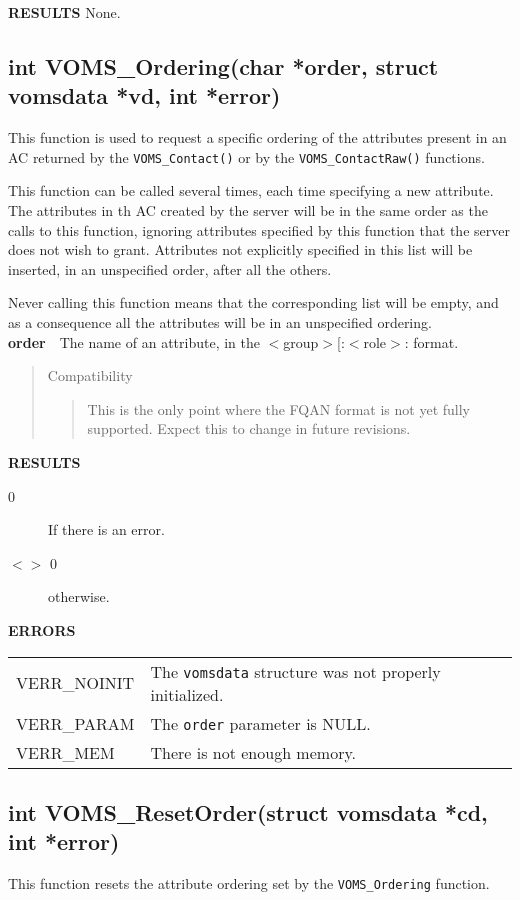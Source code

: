 \documentclass[a4paper]{book}
\newenvironment{compatibility}{\begin{quote}\color{red}Compatibility\begin{quote}}{\end{quote}\color{black}\end{quote}}
\newcommand{\errors}{\noindent \textbf{ERRORS}\newline}
\newcommand{\result}{\noindent \textbf{RESULTS}\newline}
\newcommand{\parameter}[1]{\newline\textbf{#1}\ \ }
\begin{document}
\result
None.

\subsection{int VOMS\_Ordering(char *order, struct vomsdata *vd, int *error)}

This function is used to request a specific ordering of the attributes
present in an AC returned by the \verb|VOMS_Contact()| or by the
\verb|VOMS_ContactRaw()| functions. 

This function can be called several times, each time specifying a new
attribute.  The attributes in th AC created by the server will be in
the same order as the calls to this function, ignoring attributes
specified by this function that the server does not wish to grant.
Attributes not explicitly specified in this list will be inserted, in
an unspecified order, after all the others.

Never calling this function means that the corresponding list will be
empty, and as a consequence all the attributes will be in an
unspecified ordering.
\parameter{order}{The name of an attribute, in the
  $<$group$>$[:$<$role$>$:} format.

\begin{compatibility}
This is the only point where the FQAN format is not yet fully
supported.  Expect this to change in future revisions.
\end{compatibility}

\result
\begin{description}
\item[0] If there is an error.
\item[$<>$ 0] otherwise.
\end{description}

\errors
\bigskip\begin{tabular}{lp{3in}}
VERR\_NOINIT & The \verb|vomsdata| structure was not properly
initialized.\\
VERR\_PARAM  & The \verb|order| parameter is NULL.\\
VERR\_MEM    & There is not enough memory.\\
\end{tabular}


\subsection{int VOMS\_ResetOrder(struct vomsdata *cd, int *error)}

This function resets the attribute ordering set by the
\verb|VOMS_Ordering| function.
\end{document}
